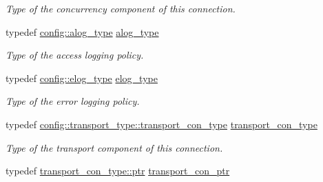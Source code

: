 \begin{DoxyCompactItemize}
\begin{DoxyCompactList}\small\item\em Type of the concurrency component of this connection. \end{DoxyCompactList}\item 
typedef \hyperlink{classwebsocketpp_1_1log_1_1stub}{config\+::alog\+\_\+type} \hyperlink{classwebsocketpp_1_1connection_a2da7d18aecf9153429bab9fcd2bab7b8}{alog\+\_\+type}\hypertarget{classwebsocketpp_1_1connection_a2da7d18aecf9153429bab9fcd2bab7b8}{}\label{classwebsocketpp_1_1connection_a2da7d18aecf9153429bab9fcd2bab7b8}

\begin{DoxyCompactList}\small\item\em Type of the access logging policy. \end{DoxyCompactList}\item 
typedef \hyperlink{classwebsocketpp_1_1log_1_1stub}{config\+::elog\+\_\+type} \hyperlink{classwebsocketpp_1_1connection_a80314ab2e4ddefdd4783fb1934fedee6}{elog\+\_\+type}\hypertarget{classwebsocketpp_1_1connection_a80314ab2e4ddefdd4783fb1934fedee6}{}\label{classwebsocketpp_1_1connection_a80314ab2e4ddefdd4783fb1934fedee6}

\begin{DoxyCompactList}\small\item\em Type of the error logging policy. \end{DoxyCompactList}\item 
typedef \hyperlink{classwebsocketpp_1_1transport_1_1asio_1_1endpoint_a75f3102766fd3ba8230e99a2b0e00457}{config\+::transport\+\_\+type\+::transport\+\_\+con\+\_\+type} \hyperlink{classwebsocketpp_1_1connection_a1deb19aef8e7bde8f955ef5f952c9d19}{transport\+\_\+con\+\_\+type}\hypertarget{classwebsocketpp_1_1connection_a1deb19aef8e7bde8f955ef5f952c9d19}{}\label{classwebsocketpp_1_1connection_a1deb19aef8e7bde8f955ef5f952c9d19}

\begin{DoxyCompactList}\small\item\em Type of the transport component of this connection. \end{DoxyCompactList}\item 
typedef \hyperlink{classwebsocketpp_1_1transport_1_1asio_1_1connection_aa6f25556860a154c4dacb4dac1dce8e4}{transport\+\_\+con\+\_\+type\+::ptr} \hyperlink{classwebsocketpp_1_1connection_ad2fce7d1a535820336275ae116384738}{transport\+\_\+con\+\_\+ptr}\hypertarget{classwebsocketpp_1_1connection_ad2fce7d1a535820336275ae116384738}{}\label{classwebsocketpp_1_1connection_ad2fce7d1a535820336275ae116384738}


\end{DoxyCompactItemize}
